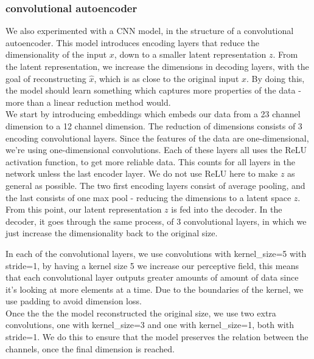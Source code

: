 \subsubsection{convolutional autoencoder}

We also experimented with a CNN model, in the structure of a convolutional autoencoder. This model introduces encoding layers that reduce the dimensionality of the input $x$, down to a smaller latent representation $z$. From the latent representation, we increase the dimensions in decoding layers, with the goal of reconstructing $\hat{x}$, which is as close to the original input $x$. By doing this, the model should learn something which captures more properties of the data - more than a linear reduction method would. \\

\noindent
We start by introducing embeddings which embeds our data from a 23 channel dimension to a 12 channel dimension. The reduction of dimensions consists of 3 encoding convolutional layers. Since the features of the data are one-dimensional, we're using one-dimensional convolutions. Each of these layers all uses the ReLU activation function, to get more reliable data. This counts for all layers in the network unless the last encoder layer. We do not use ReLU here to make $z$ as general as possible. The two first encoding layers consist of average pooling, and the last consists of one max pool - reducing the dimensions to a latent space $z$.  \\


\noindent
From this point, our latent representation $z$ is fed into the decoder. In the decoder, it goes through the same process, of 3 convolutional layers, in which we just increase the dimensionality back to the original size.

\noindent
In each of the convolutional layers, we use convolutions with kernel\_size=5 with stride=1, by having a kernel size 5 we increase our perceptive field, this means that each convolutional layer outputs greater amounts of amount of data since it's looking at more elements at a time. Due to the boundaries of the kernel, we use padding to avoid dimension loss.\\

\noindent
Once the the the model reconstructed the original size, we use two extra convolutions, one with kernel\_size=3 and one with kernel\_size=1, both with stride=1. We do this to ensure that the model preserves the relation between the channels, once the final dimension is reached.